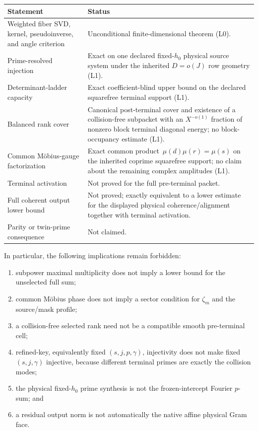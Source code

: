 \begin{center}
\small
\begin{tabular}{>{\raggedright\arraybackslash}p{}
                >{\raggedright\arraybackslash}p{}}
\toprule
Statement & Status \\
\midrule
Weighted fiber SVD, kernel, pseudoinverse, and angle criterion
& Unconditional finite-dimensional theorem (L0).\\
Prime-resolved injection
& Exact on one declared fixed-\(h_0\) physical source system under the
  inherited \(D=o(J)\) row geometry (L1).\\
Determinant-ladder capacity
& Exact coefficient-blind upper bound on the declared squarefree terminal
  support (L1).\\
Balanced rank cover
& Canonical post-terminal cover and existence of a collision-free subpacket
  with an \(X^{-o(1)}\) fraction of nonzero block terminal diagonal energy;
  no block-occupancy estimate (L1).\\
Common M\"obius-gauge factorization
& Exact common product \,\(\mu(d)\mu(r)=\mu(s)\) on the inherited coprime
  squarefree support; no claim about the remaining complex amplitudes (L1).\\
Terminal activation
& Not proved for the full pre-terminal packet.\\
Full coherent output lower bound
& Not proved; exactly equivalent to a lower estimate for the displayed
  physical coherence/alignment together with terminal activation.\\
Parity or twin-prime consequence
& Not claimed.\\
\bottomrule
\end{tabular}
\end{center}

In particular, the following implications remain forbidden:
\begin{enumerate}[label=\textup{(\roman*)},leftmargin=3em]
 \item subpower maximal multiplicity does not imply a lower bound for the
       unselected full sum;
 \item common M\"obius phase does not imply a sector condition for
       \(\zeta_m\) and the source/mask profile;
 \item a collision-free selected rank need not be a compatible smooth
       pre-terminal cell;
 \item refined-key, equivalently fixed \((s,j,p,\gamma)\), injectivity does
       not make fixed \((s,j,\gamma)\) injective, because different terminal
       primes are exactly the collision modes;
 \item the physical fixed-\(h_0\) prime synthesis is not the
       frozen-intercept Fourier \(p\)-sum; and
 \item a residual output norm is not automatically the native affine
       physical Gram face.
\end{enumerate}

